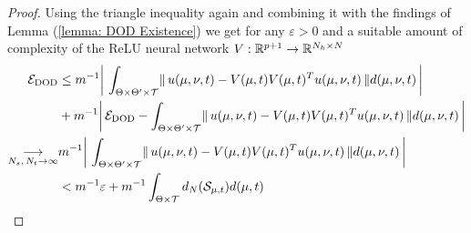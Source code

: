 \begin{proof}
    Using the triangle inequality again and combining it with the findings of Lemma (\ref{lemma: DOD Existence}) we get for any $\varepsilon > 0$ and a suitable amount of complexity of the ReLU neural network $V: \mathbb{R}^{p+1} \to \mathbb{R}^{N_h \times N}$
    \begin{align*}
        \mathcal{E}_{\text{DOD}} &\leq m^{-1} \bigg\vert \, \int_{\Theta \times \Theta' \times \mathcal{T}} \lVert \, u(\mu, \nu, t) - V(\mu, t) V(\mu, t)^T u(\mu, \nu, t) \, \rVert d(\mu, \nu, t) \, \bigg\vert \\
        &+ m^{-1} \bigg\vert \, \mathcal{E}_{\text{DOD}} - \int_{\Theta \times \Theta' \times \mathcal{T}} \lVert \, u(\mu, \nu, t) - V(\mu, t) V(\mu, t)^T u(\mu, \nu, t) \, \rVert d(\mu, \nu, t) \, \bigg\vert \\
        \underset{N_s,\, N_t \to \infty}{\longrightarrow} &m^{-1} \bigg\vert \, \int_{\Theta \times \Theta' \times \mathcal{T}} \lVert \, u(\mu, \nu, t) - V(\mu, t) V(\mu, t)^T u(\mu, \nu, t) \, \rVert d(\mu, \nu, t) \, \bigg\vert \\
        &< m^{-1}\varepsilon + m^{-1}\int_{\Theta \times \mathcal{T}} d_N(\mathcal{S}_{\mu, t}) d(\mu, t)
    \end{align*}

    
\end{proof}

